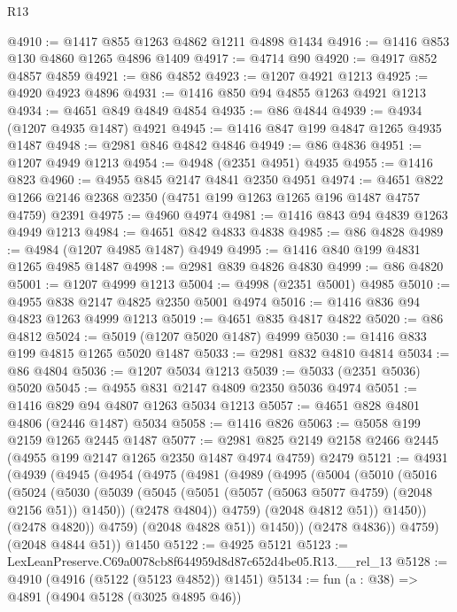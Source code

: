 \begin{lexlean}{R13}
\begin{coremodule}
@4910 := @1417 @855 @1263 @4862 @1211 @4898 @1434
@4916 := @1416 @853 @130 @4860 @1265 @4896 @1409
@4917 := @4714 @90
@4920 := @4917 @852 @4857 @4859
@4921 := @86 @4852
@4923 := @1207 @4921 @1213
@4925 := @4920 @4923 @4896
@4931 := @1416 @850 @94 @4855 @1263 @4921 @1213
@4934 := @4651 @849 @4849 @4854
@4935 := @86 @4844
@4939 := @4934 (@1207 @4935 @1487) @4921
@4945 := @1416 @847 @199 @4847 @1265 @4935 @1487
@4948 := @2981 @846 @4842 @4846
@4949 := @86 @4836
@4951 := @1207 @4949 @1213
@4954 := @4948 (@2351 @4951) @4935
@4955 := @1416 @823
@4960 := @4955 @845 @2147 @4841 @2350 @4951
@4974 := @4651 @822 @1266 @2146 @2368 @2350 (@4751 @199 @1263 @1265 @196 @1487 @4757 @4759) @2391
@4975 := @4960 @4974
@4981 := @1416 @843 @94 @4839 @1263 @4949 @1213
@4984 := @4651 @842 @4833 @4838
@4985 := @86 @4828
@4989 := @4984 (@1207 @4985 @1487) @4949
@4995 := @1416 @840 @199 @4831 @1265 @4985 @1487
@4998 := @2981 @839 @4826 @4830
@4999 := @86 @4820
@5001 := @1207 @4999 @1213
@5004 := @4998 (@2351 @5001) @4985
@5010 := @4955 @838 @2147 @4825 @2350 @5001 @4974
@5016 := @1416 @836 @94 @4823 @1263 @4999 @1213
@5019 := @4651 @835 @4817 @4822
@5020 := @86 @4812
@5024 := @5019 (@1207 @5020 @1487) @4999
@5030 := @1416 @833 @199 @4815 @1265 @5020 @1487
@5033 := @2981 @832 @4810 @4814
@5034 := @86 @4804
@5036 := @1207 @5034 @1213
@5039 := @5033 (@2351 @5036) @5020
@5045 := @4955 @831 @2147 @4809 @2350 @5036 @4974
@5051 := @1416 @829 @94 @4807 @1263 @5034 @1213
@5057 := @4651 @828 @4801 @4806 (@2446 @1487) @5034
@5058 := @1416 @826
@5063 := @5058 @199 @2159 @1265 @2445 @1487
@5077 := @2981 @825 @2149 @2158 @2466 @2445 (@4955 @199 @2147 @1265 @2350 @1487 @4974 @4759) @2479
@5121 := @4931
    (@4939
      (@4945
        (@4954
          (@4975
            (@4981
              (@4989
                (@4995
                  (@5004
                    (@5010
                      (@5016
                        (@5024
                          (@5030
                            (@5039
                              (@5045 (@5051 (@5057 (@5063 @5077 @4759) (@2048 @2156 @51)) @1450))
                              (@2478 @4804))
                            @4759)
                          (@2048 @4812 @51))
                        @1450))
                    (@2478 @4820))
                  @4759)
                (@2048 @4828 @51))
              @1450))
          (@2478 @4836))
        @4759)
      (@2048 @4844 @51))
    @1450
@5122 := @4925 @5121
@5123 := LexLeanPreserve.C69a0078cb8f644959d8d87c652d4be05.R13.__rel_13
@5128 := @4910 (@4916 (@5122 (@5123 @4852)) @1451)
@5134 := fun (a : @38) => @4891 (@4904 @5128 (@3025 @4895 @46))

\end{coremodule}
\end{lexlean}
